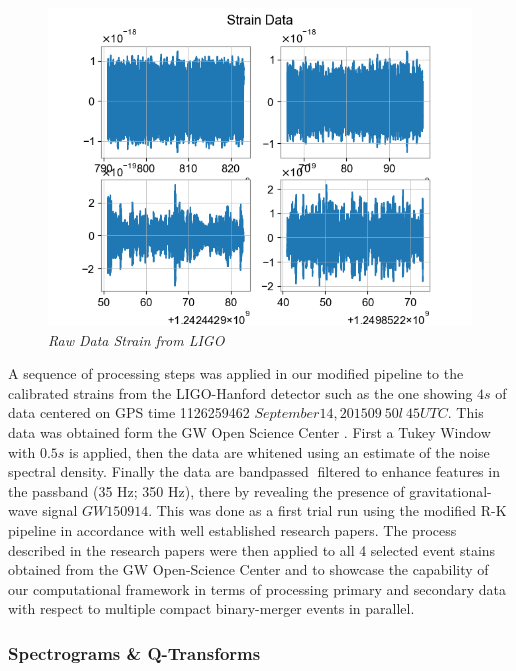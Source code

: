     \begin{figure}[H]
        \centering
        \includegraphics[width=1.0\linewidth]{images/44_01_Raw Strain Data.png}
        \caption{\textit{Raw Data Strain from LIGO}}
        \label{fig:LIGO1_PlaceHolder_fig}
    \end{figure}
    A sequence of processing steps was applied in our modified pipeline to the calibrated strains from the LIGO-Hanford detector such as the one showing $4 s$ of data centered on GPS time 1126259462 \(September 14, 2015 09\:50l\:45 UTC\). This data was obtained form the GW Open Science Center \cite{00_LIGOOpenSciData}. First a Tukey Window with $0.5 s$ is applied, then the data are whitened using an estimate of the noise spectral density. Finally the data are bandpassed filtered to enhance features in the passband (35 Hz; 350 Hz), there by revealing the presence of gravitational-wave signal $GW150914.$ This was done as a first trial run using the modified R-K pipeline in accordance with well established research papers. \cite{00.2_schutz2012GWDataAnalysis} \cite{00.5_GWDetectionNoiseCatalogue}
    The process described in the research papers were then applied to all 4 selected event stains obtained from the GW Open-Science Center and to showcase the capability of our computational framework in terms of processing primary and secondary data with respect to multiple compact binary-merger events in parallel.


    \subsubsection{Spectrograms \& Q-Transforms}

